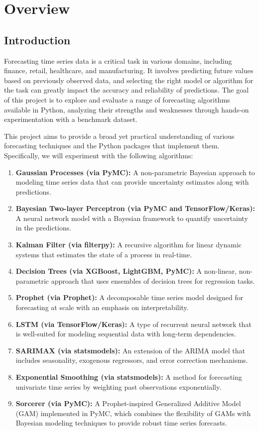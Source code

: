 \chapter{Overview}

\section{Introduction}
Forecasting time series data is a critical task in various domains, including finance, retail, healthcare, and manufacturing. It involves predicting future values based on previously observed data, and selecting the right model or algorithm for the task can greatly impact the accuracy and reliability of predictions. The goal of this project is to explore and evaluate a range of forecasting algorithms available in Python, analyzing their strengths and weaknesses through hands-on experimentation with a benchmark dataset.

This project aims to provide a broad yet practical understanding of various forecasting techniques and the Python packages that implement them. Specifically, we will experiment with the following algorithms:

\begin{enumerate}
	\item \textbf{Gaussian Processes (via PyMC):} A non-parametric Bayesian approach to modeling time series data that can provide uncertainty estimates along with predictions.
	\item \textbf{Bayesian Two-layer Perceptron (via PyMC and TensorFlow/Keras):} A neural network model with a Bayesian framework to quantify uncertainty in the predictions.
	\item \textbf{Kalman Filter (via filterpy):} A recursive algorithm for linear dynamic systems that estimates the state of a process in real-time.
	\item \textbf{Decision Trees (via XGBoost, LightGBM, PyMC):} A non-linear, non-parametric approach that uses ensembles of decision trees for regression tasks.
	\item \textbf{Prophet (via Prophet):} A decomposable time series model designed for forecasting at scale with an emphasis on interpretability.
	\item \textbf{LSTM (via TensorFlow/Keras):} A type of recurrent neural network that is well-suited for modeling sequential data with long-term dependencies.
	\item \textbf{SARIMAX (via statsmodels):} An extension of the ARIMA model that includes seasonality, exogenous regressors, and error correction mechanisms.
	\item \textbf{Exponential Smoothing (via statsmodels):} A method for forecasting univariate time series by weighting past observations exponentially.
	\item \textbf{Sorcerer (via PyMC):} A Prophet-inspired Generalized Additive Model (GAM) implemented in PyMC, which combines the flexibility of GAMs with Bayesian modeling techniques to provide robust time series forecasts.
\end{enumerate}


